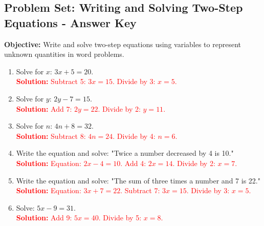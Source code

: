 \documentclass[12pt]{article}
\title{}
\date{}
\begin{document}
\subsection*{Problem Set: Writing and Solving Two-Step Equations - Answer Key}
\onehalfspacing

\begin{tcolorbox}[colframe=black!40, colback=gray!5, 
coltitle=black, colbacktitle=black!20, fonttitle=\bfseries\Large, 
title=Learning Objective, halign title=center, left=5pt, right=5pt, top=5pt, bottom=15pt]
\textbf{Objective:} Write and solve two-step equations using variables to represent unknown quantities in word problems.
\end{tcolorbox}

\begin{tcolorbox}[colframe=black!60, colback=white, 
coltitle=black, colbacktitle=black!15, fonttitle=\bfseries\Large, 
title=Exercises, halign title=center, left=10pt, right=10pt, top=10pt, bottom=60pt]
\begin{enumerate}[itemsep=3em]
    \item Solve for \(x\): \( 3x + 5 = 20 \).\\
    \textcolor{red}{\textbf{Solution:} Subtract 5: \( 3x = 15 \). Divide by 3: \( x = 5 \).}

    \item Solve for \(y\): \( 2y - 7 = 15 \).\\
    \textcolor{red}{\textbf{Solution:} Add 7: \( 2y = 22 \). Divide by 2: \( y = 11 \).}

    \item Solve for \(n\): \( 4n + 8 = 32 \).\\
    \textcolor{red}{\textbf{Solution:} Subtract 8: \( 4n = 24 \). Divide by 4: \( n = 6 \).}

    \item Write the equation and solve: "Twice a number decreased by 4 is 10."\\
    \textcolor{red}{\textbf{Solution:} Equation: \( 2x - 4 = 10 \). Add 4: \( 2x = 14 \). Divide by 2: \( x = 7 \).}

    \item Write the equation and solve: "The sum of three times a number and 7 is 22."\\
    \textcolor{red}{\textbf{Solution:} Equation: \( 3x + 7 = 22 \). Subtract 7: \( 3x = 15 \). Divide by 3: \( x = 5 \).}

    \item Solve: \( 5x - 9 = 31 \).\\
    \textcolor{red}{\textbf{Solution:} Add 9: \( 5x = 40 \). Divide by 5: \( x = 8 \).}


\end{enumerate}
\end{tcolorbox}
\end{document}
